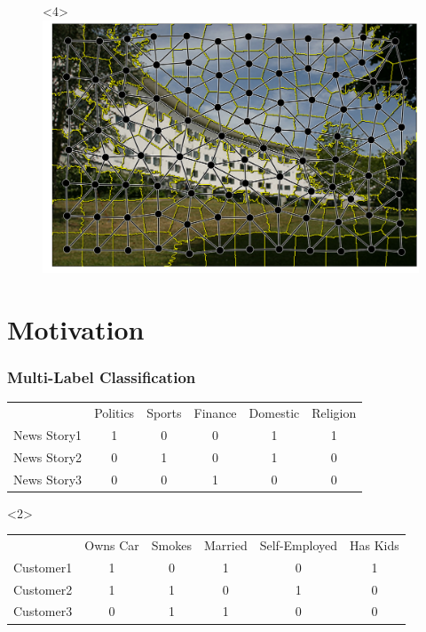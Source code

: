 \documentclass[final,ignorenonframetext,compress]{beamer}
\begin{document}
\begin{frame}
\begin{figure}
        \begin{onlyenv}<4>
            \includegraphics[width=.6\linewidth]{images/scene_sp_graph}%
        \end{onlyenv}%
    \end{figure}
\end{frame}

\section{Motivation}
\begin{frame}
    \frametitle{Multi-Label Classification}

    \begin{table}
        \begin{tabularx}{\linewidth}{lccccc}
            \toprule
            & \footnotesize{Politics} & \footnotesize{Sports} & \footnotesize{Finance} & \footnotesize{Domestic} & \footnotesize{Religion}\\
            \cmidrule{2-6}
            News Story1 & 1 & 0 & 0 & 1 & 1\\
            News Story2 & 0 & 1 & 0 & 1 & 0\\
            News Story3 & 0 & 0 & 1 & 0 & 0\\
            \bottomrule
        \end{tabularx}
    \end{table}

    \begin{visibleenv}<2>
    \begin{table}
        \begin{tabularx}{\linewidth}{lccccc}
            \toprule
            & \footnotesize{Owns Car} & \footnotesize{Smokes} & \footnotesize{Married} & \footnotesize{Self-Employed} & \footnotesize{Has Kids}\\
            \cmidrule{2-6}
            Customer1 & 1 & 0 & 1 & 0 & 1\\
            Customer2 & 1 & 1 & 0 & 1 & 0\\
            Customer3 & 0 & 1 & 1 & 0 & 0\\
            \bottomrule
        \end{tabularx}
    \end{table}
    \end{visibleenv}
    
\end{frame}
\end{document}

